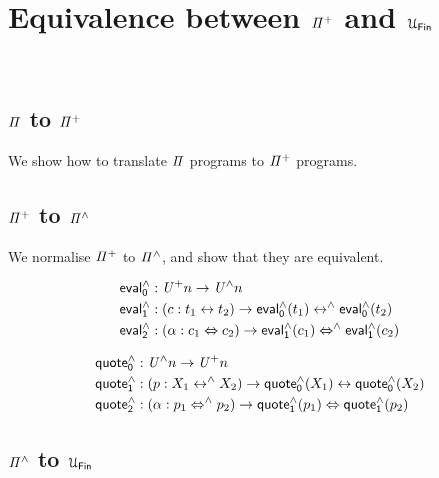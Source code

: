 \section{Equivalence between \texorpdfstring{$\mathit{{\Pi}^{+}}$}{Pi} and \texorpdfstring{$\UFin$}{UFin}}~\label{sec:equivalence}

\subsection{$\mathit{\Pi}$ to $\mathit{{\Pi}^{+}}$}

We show how to translate $\mathit{\Pi}$ programs to $\mathit{{\Pi}^{+}}$ programs.

\subsection{$\mathit{{\Pi}^{+}}$ to $\mathit{{\Pi}^{\wedge}}$}

We normalise $\mathit{{\Pi}^{+}}$ to $\mathit{{\Pi}^{\wedge}}$, and show that they are equivalent.

\begin{definition}
  \begin{align*}
    \evalh_{0} & : \UPlus n \to \UHat n                                                      \\
    \evalh_{1} & : (c : t_{1} \iso t_{2}) \to \evalh_{0}(t_{1}) \isoh \evalh_{0}(t_{2})      \\
    \evalh_{2} & : (\alpha : c_{1} \Iso c_{2}) \to \evalh_{1}(c_{1}) \Isoh \evalh_{1}(c_{2}) \\
  \end{align*}
\end{definition}

\begin{definition}
  \begin{align*}
    \quoteh_{0} & : \UHat n \to \UPlus n                                                        \\
    \quoteh_{1} & : (p : X_{1} \isoh X_{2}) \to \quoteh_{0}(X_{1}) \iso \quoteh_{0}(X_{2})      \\
    \quoteh_{2} & : (\alpha : p_{1} \Isoh p_{2}) \to \quoteh_{1}(p_{1}) \Iso \quoteh_{1}(p_{2}) \\
  \end{align*}
\end{definition}

\subsection{$\mathit{{\Pi}^{\wedge}}$ to $\UFin$}

